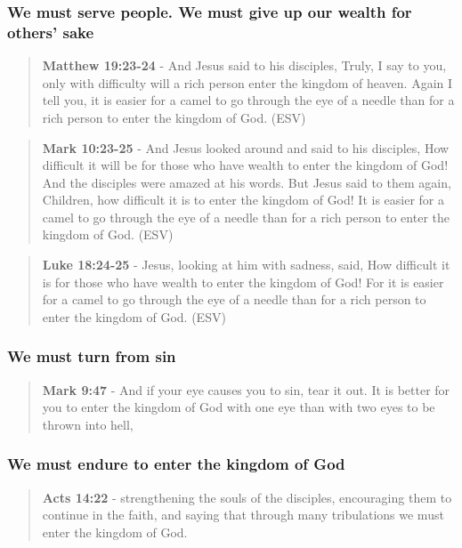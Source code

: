 \documentclass[11pt]{article}
\begin{document}
\subsubsection{We must serve people. We must give up our wealth for others' sake}
\label{sec:orgae57abd}
\begin{quote}
\textbf{Matthew 19:23-24} - And Jesus said to his disciples, Truly, I say to you, only with difficulty will a rich person enter the kingdom of heaven. Again I tell you, it is easier for a camel to go through the eye of a needle than for a rich person to enter the kingdom of God. (ESV)
\end{quote}

\begin{quote}
\textbf{Mark 10:23-25} - And Jesus looked around and said to his disciples, How difficult it will be for those who have wealth to enter the kingdom of God! And the disciples were amazed at his words. But Jesus said to them again, Children, how difficult it is to enter the kingdom of God! It is easier for a camel to go through the eye of a needle than for a rich person to enter the kingdom of God. (ESV)
\end{quote}

\begin{quote}
\textbf{Luke 18:24-25} - Jesus, looking at him with sadness, said, How difficult it is for those who have wealth to enter the kingdom of God! For it is easier for a camel to go through the eye of a needle than for a rich person to enter the kingdom of God. (ESV)
\end{quote}

\subsubsection{We must turn from sin}
\label{sec:orgfdb0eb0}
\begin{quote}
\textbf{Mark 9:47} - And if your eye causes you to sin, tear it out. It is better for you to enter the kingdom of God with one eye than with two eyes to be thrown into hell,
\end{quote}

\subsubsection{We must endure to enter the kingdom of God}
\label{sec:orgc49e8b9}
\begin{quote}
\textbf{Acts 14:22} - strengthening the souls of the disciples, encouraging them to continue in the faith, and saying that through many tribulations we must enter the kingdom of God.
\end{quote}
\end{document}
